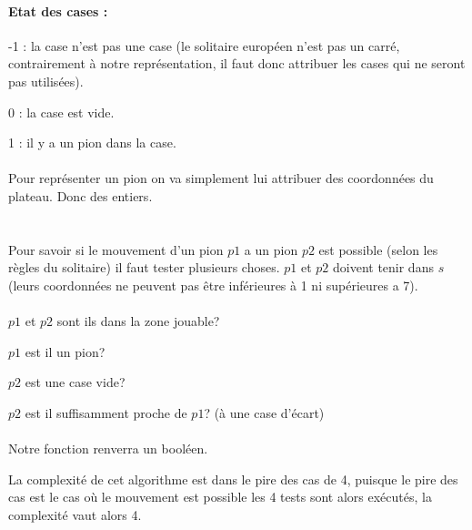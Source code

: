 \documentclass[a4paper]{article}
\begin{document}
  \paragraph{Etat des cases :}
  \hfill \break

  -1 : la case n'est pas une case (le solitaire européen n'est pas un carré, contrairement à notre représentation, il faut donc attribuer les cases qui ne seront pas utilisées).

  0 : la case est vide.

  1 : il y a un pion dans la case.

  \paragraph{}

  Pour représenter un pion on va simplement lui attribuer des coordonnées du plateau. Donc des entiers.

  

  \section{}
  Pour savoir si le mouvement d'un pion $p1$ a un pion $p2$ est possible (selon les règles du solitaire) il faut tester plusieurs choses. $p1$ et $p2$ doivent tenir dans $s$ (leurs coordonnées ne peuvent pas être inférieures à 1  ni supérieures a 7).

  \paragraph{}
     $p1$ et $p2$ sont ils dans la zone jouable?

    $p1$ est il un pion?

    $p2$ est une case vide?

    $p2$ est il suffisamment proche de $p1$? (à une case d'écart)

  \paragraph{}
  Notre fonction renverra un booléen.

  

  La complexité de cet algorithme est dans le pire des cas de 4, puisque le pire des cas est le cas où le mouvement est possible les 4 tests sont alors exécutés, la complexité vaut alors 4.

  \section{}
\end{document}
